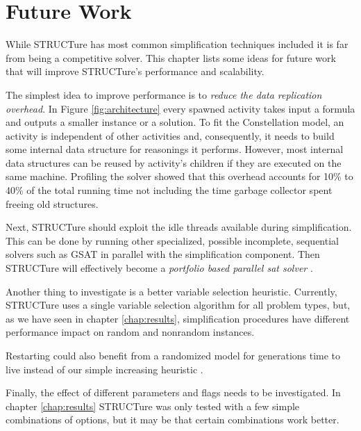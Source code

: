 \chapter{Future Work}
\label{chap:future}

While STRUCTure has most common simplification techniques included
it is far from being a competitive solver. This chapter lists some
ideas for future work that will improve STRUCTure's performance
and scalability.

The simplest idea to improve performance is to \emph{reduce the
data replication overhead}. In Figure \ref{fig:architecture}
every spawned activity takes input a formula and outputs a
smaller instance or a solution. To fit the Constellation model,
an activity is independent of other activities and, consequently,
it needs to build some internal data structure for reasonings it
performs. However, most internal data structures can be reused
by activity's children if they are executed on the same machine.
Profiling the solver showed that this overhead accounts for 10\%
to 40\% of the total running time not including the time garbage
collector spent freeing old structures.

Next, STRUCTure should exploit the idle threads available
during simplification. This can be done by running other
specialized, possible incomplete, sequential solvers such as GSAT
\cite{Selman92anew} in parallel with the simplification component.
Then STRUCTure will effectively become a \emph{portfolio based
parallel sat solver} \cite{5547119}.

Another thing to investigate is a better variable selection
heuristic.  Currently, STRUCTure uses a single variable selection
algorithm for all problem types, but, as we
have seen in chapter \ref{chap:results}, simplification procedures
have different performance impact on random and nonrandom instances.

Restarting could also benefit from a randomized model for
generations time to live instead of our simple increasing heuristic
\cite{Gomes:1998:BCS:295240.295710}.


Finally, the effect of different parameters and flags needs to be
investigated. In chapter \ref{chap:results} STRUCTure was only
tested with a few simple combinations of options, but it may be
that certain combinations work better.

